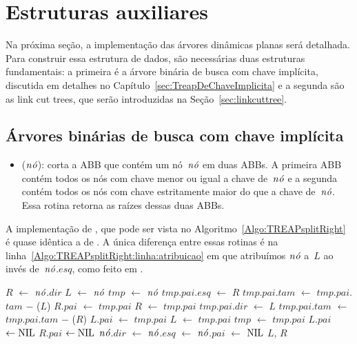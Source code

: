 \section{Estruturas auxiliares}

Na próxima seção, a implementação das árvores dinâmicas planas será detalhada. Para construir essa estrutura de dados, são necessárias duas estruturas fundamentais: a primeira é a árvore binária de busca com chave implícita, discutida em detalhes no Capítulo~\ref{sec:TreapDeChaveImplicita} e a segunda são as link cut trees, que serão introduzidas na Seção~\ref{sec:linkcuttree}.



\subsection{Árvores binárias de busca com chave implícita}

\begin{itemize}
\item \treapSplitRight($\node$): corta a ABB que contém um nó~$\node$ em duas ABBs. A primeira ABB contém todos os nós com chave menor ou igual a chave de~$\node$ e a segunda contém todos os nós com chave estritamente maior do que a chave de~$\node$. Essa rotina retorna as raízes dessas duas ABBs.
\end{itemize}

A implementação de \treapSplitRight{}, que pode ser vista no Algoritmo~\ref{Algo:TREAPsplitRight} é quase idêntica a de \treapSplit{}.
A única diferença entre essas rotinas é na linha~\ref{Algo:TREAPsplitRight:linha:atribuicao} em que atribuímos $\node$ a~$L$ ao invés de~$\node$.$esq$, como feito em \treapSplit{}.

\begin{algorithm}
\caption{\treapSplitRight($\node$)}
\label{Algo:TREAPsplitRight}
\begin{algorithmic}[1]
\State $R$ $\gets $ $\node$.$dir$
\State $L$ $\gets $ $\node$ \label{Algo:TREAPsplitRight:linha:atribuicao}
\State $tmp$ $\gets$ $\node$
    \State $tmp$.$pai$.$esq$ $\gets$ $R$
    \State $tmp$.$pai$.$tam$ $\gets$ $tmp$.$pai$.$tam$ $\mathit{-}$ \treapGetSize($L$)
    \State $R$.$pai$ $\gets$ $tmp$.$pai$
    \EndIf
    \State $R$ $\gets$ $tmp$.$pai$
  \Else
    \State $tmp$.$pai$.$dir$ $\gets$ $L$ 
    \State $tmp$.$pai$.$tam$ $\gets$ $tmp$.$pai$.$tam$ $\mathit{-}$ \treapGetSize($R$)
    \State $L$.$pai$ $\gets$ $tmp$.$pai$
    \EndIf
    \State $L$ $\gets$ $tmp$.$pai$
  \EndIf
  \State $tmp$ $\gets$ $tmp$.$pai$
\EndWhile
{} $L$.$pai$ $\gets\text{NIL}$\EndIf
{} $R$.$pai$ $\gets\text{NIL}$\EndIf
\State $\node$.$dir$ $\gets $ $\node$.$esq$ $\gets$ $\node$.$pai$ $\gets$ $\text{NIL}$
\State\Return $L$, $R$
\end{algorithmic}
\end{algorithm}






